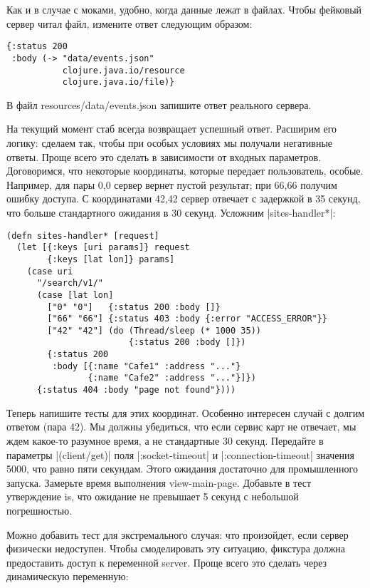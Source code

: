 Как и в случае с моками, удобно, когда данные лежат в файлах. Чтобы фейковый
сервер читал файл, измените ответ следующим образом:

\begin{verbatim}
{:status 200
 :body (-> "data/events.json"
           clojure.java.io/resource
           clojure.java.io/file)}
\end{verbatim}

В файл resources/data/events.json запишите ответ реального сервера.

На текущий момент стаб всегда возвращает успешный ответ. Расширим его логику:
сделаем так, чтобы при особых условиях мы получали негативные ответы. Проще
всего это сделать в зависимости от входных параметров. Договоримся, что
некоторые координаты, которые передает пользователь, особые. Например, для пары
0,0 сервер вернет пустой результат; при 66,66 получим ошибку доступа. С
координатами 42,42 сервер отвечает с задержкой в 35 секунд, что больше
стандартного ожидания в 30 секунд. Усложним \spverb|sites-handler*|:

\begin{verbatim}
(defn sites-handler* [request]
  (let [{:keys [uri params]} request
        {:keys [lat lon]} params]
    (case uri
      "/search/v1/"
      (case [lat lon]
        ["0" "0"]   {:status 200 :body []}
        ["66" "66"] {:status 403 :body {:error "ACCESS_ERROR"}}
        ["42" "42"] (do (Thread/sleep (* 1000 35))
                        {:status 200 :body []})
        {:status 200
         :body [{:name "Cafe1" :address "..."}
                {:name "Cafe2" :address "..."}]})
      {:status 404 :body "page not found"})))
\end{verbatim}

Теперь напишите тесты для этих координат. Особенно интересен случай с долгим
ответом (пара 42). Мы должны убедиться, что если сервис карт не отвечает, мы
ждем какое-то разумное время, а не стандартные 30 секунд. Передайте в параметры
\spverb|(client/get)| поля \spverb|:socket-timeout| и \spverb|:connection-timeout| значения 5000, что
равно пяти секундам. Этого ожидания достаточно для промышленного
запуска. Замерьте время выполнения view-main-page. Добавьте в тест утверждение
is, что ожидание не превышает 5 секунд с небольшой погрешностью.

Можно добавить тест для экстремального случая: что произойдет, если сервер
физически недоступен. Чтобы смоделировать эту ситуацию, фикстура должна
предоставить доступ к переменной server. Проще всего это сделать через
динамическую переменную:

